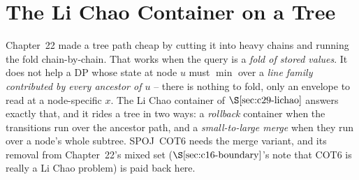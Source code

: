 \section{The Li Chao Container on a Tree}\label{sec:c29-path}

\begin{previouslybox}
Chapter~22 made a tree path cheap by cutting it into heavy chains and running
the fold chain-by-chain.  That works when the query is a \emph{fold of stored
values}.  It does not help a DP whose state at node \(u\) must \(\min\) over a
\emph{line family contributed by every ancestor of \(u\)} -- there is nothing to
fold, only an envelope to read at a node-specific \(x\).  The Li Chao container
of \(\secref{c29-lichao}\) answers exactly that, and it rides a tree in two
ways: a \emph{rollback} container when the transitions run over the ancestor
path, and a \emph{small-to-large merge} when they run over a node's whole
subtree.  SPOJ~COT6 needs the merge variant, and its removal from Chapter~22's
mixed set (\(\secref{c16-boundary}\)'s note that COT6 is really a Li Chao
problem) is paid back here.
\end{previouslybox}

